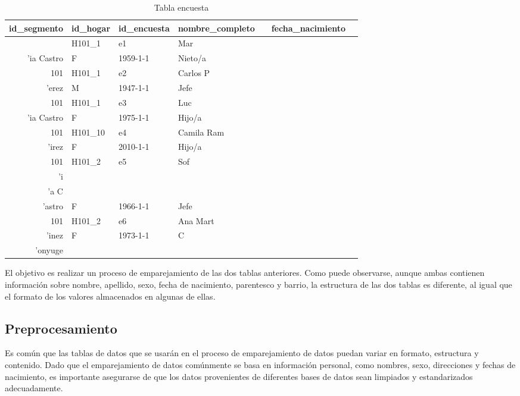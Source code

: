 \documentclass[
  12pt,
]{book}
\begin{document}
\begin{table}[t]
\caption*{
{\fontsize{20}{25}\selectfont  Tabla encuesta\fontsize{12}{15}\selectfont }
} 
\fontsize{12.0pt}{14.0pt}\selectfont
\begin{tabular*}{\linewidth}{@{\extracolsep{\fill}}rllllrl}
\toprule
id\_segmento & id\_hogar & id\_encuesta & nombre\_completo & {\bfseries \cellcolor[HTML]{F9F9F9}{sexo}} & fecha\_nacimiento & {\bfseries \cellcolor[HTML]{F9F9F9}{parentesco}} \\ 
\midrule\addlinespace[2.5pt]
101 & H101\_1 & e1 & Mar\\'ia Castro & F & 1959-1-1 & Nieto/a \\ 
101 & H101\_1 & e2 & Carlos P\\'erez & M & 1947-1-1 & Jefe \\ 
101 & H101\_1 & e3 & Luc\\'ia Castro & F & 1975-1-1 & Hijo/a \\ 
101 & H101\_10 & e4 & Camila Ram\\'irez & F & 2010-1-1 & Hijo/a \\ 
101 & H101\_2 & e5 & Sof\\'i\\'a C\\'astro & F & 1966-1-1 & Jefe \\ 
101 & H101\_2 & e6 & Ana Mart\\'inez & F & 1973-1-1 & C\\'onyuge \\ 
\bottomrule
\end{tabular*}
\end{table}

El objetivo es realizar un proceso de emparejamiento de las dos tablas anteriores. Como puede observarse, aunque ambas contienen información sobre nombre, apellido, sexo, fecha de nacimiento, parentesco y barrio, la estructura de las dos tablas es diferente, al igual que el formato de los valores almacenados en algunas de ellas.

\subsection{Preprocesamiento}\label{preprocesamiento}

Es común que las tablas de datos que se usarán en el proceso de emparejamiento de datos puedan variar en formato, estructura y contenido. Dado que el emparejamiento de datos comúnmente se basa en información personal, como nombres, sexo, direcciones y fechas de nacimiento, es importante asegurarse de que los datos provenientes de diferentes bases de datos sean limpiados y estandarizados adecuadamente.
\end{document}
